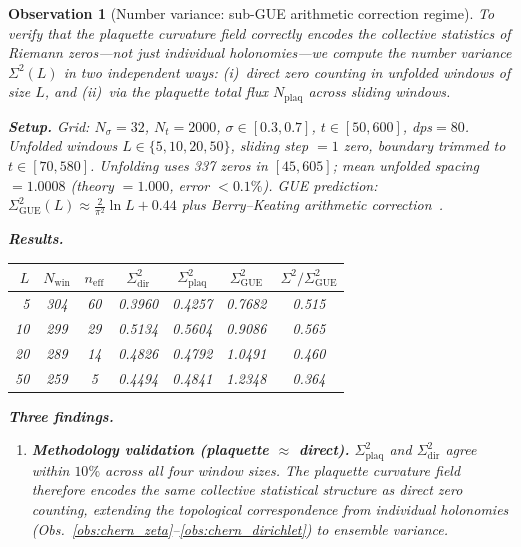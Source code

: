 \documentclass[11pt, a4paper]{article}
\theoremstyle{definition}
\theoremstyle{plain}
\newtheorem{observation}[theorem]{Observation}
\begin{document}
\begin{observation}[Number variance: sub-GUE arithmetic correction regime]
\label{obs:number_variance}
To verify that the plaquette curvature field correctly encodes the
\emph{collective} statistics of Riemann zeros---not just individual
holonomies---we compute the number variance $\Sigma^2(L)$ in two
independent ways: (i)~direct zero counting in unfolded windows of size
$L$, and (ii)~via the plaquette total flux $N_{\mathrm{plaq}}$ across
sliding windows.

\smallskip\noindent
\textbf{Setup.} Grid: $N_\sigma=32$, $N_t=2000$, $\sigma\in[0.3,0.7]$,
$t\in[50,600]$, dps${}=80$.  Unfolded windows $L\in\{5,10,20,50\}$,
sliding step $=1$ zero, boundary trimmed to $t\in[70,580]$.
Unfolding uses 337 zeros in $[45,605]$; mean unfolded spacing
$= 1.0008$ (theory $= 1.000$, error $<0.1\%$).
GUE prediction: $\Sigma^2_{\mathrm{GUE}}(L)\approx
\tfrac{2}{\pi^2}\!\ln L + 0.44$ plus Berry--Keating arithmetic
correction~\cite{berry1988}.

\smallskip\noindent
\textbf{Results.}

\begin{center}
\small
\begin{tabular}{@{} r c c c c c c @{}}
\toprule
$L$ & $N_{\mathrm{win}}$ & $n_{\mathrm{eff}}$ &
  $\Sigma^2_{\mathrm{dir}}$ & $\Sigma^2_{\mathrm{plaq}}$ &
  $\Sigma^2_{\mathrm{GUE}}$ & $\Sigma^2/\Sigma^2_{\mathrm{GUE}}$ \\
\midrule
 5 & 304 & 60 & 0.3960 & 0.4257 & 0.7682 & 0.515 \\
10 & 299 & 29 & 0.5134 & 0.5604 & 0.9086 & 0.565 \\
20 & 289 & 14 & 0.4826 & 0.4792 & 1.0491 & 0.460 \\
50 & 259 &  5 & 0.4494 & 0.4841 & 1.2348 & 0.364 \\
\bottomrule
\end{tabular}
\end{center}

\smallskip\noindent
\textbf{Three findings.}
\begin{enumerate}
  \item \textbf{Methodology validation (plaquette $\approx$ direct).}
        $\Sigma^2_{\mathrm{plaq}}$ and $\Sigma^2_{\mathrm{dir}}$ agree
        within $10\%$ across all four window sizes.  The plaquette
        curvature field therefore encodes the \emph{same} collective
        statistical structure as direct zero counting, extending the
        topological correspondence from individual holonomies
        (Obs.~\ref{obs:chern_zeta}--\ref{obs:chern_dirichlet}) to
        ensemble variance.


\end{enumerate}
\end{observation}
\end{document}
